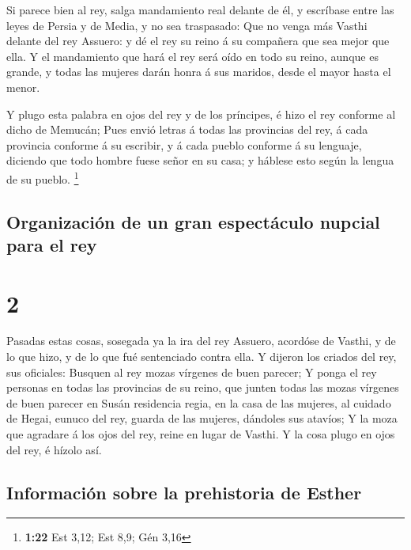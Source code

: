  Si parece bien al rey, salga mandamiento real delante de
él, y escríbase entre las leyes de Persia y de Media, y no sea
traspasado: Que no venga más Vasthi delante del rey Assuero: y dé el rey
su reino á su compañera que sea mejor que ella.  Y el
mandamiento que hará el rey será oído en todo su reino, aunque es
grande, y todas las mujeres darán honra á sus maridos, desde el mayor
hasta el menor.

 Y plugo esta palabra en ojos del rey y de los príncipes,
é hizo el rey conforme al dicho de Memucán;  Pues envió
letras á todas las provincias del rey, á cada provincia conforme á su
escribir, y á cada pueblo conforme á su lenguaje, diciendo que todo
hombre fuese señor en su casa; y háblese esto según la lengua de su
pueblo. \footnote{\textbf{1:22} Est 3,12; Est 8,9; Gén 3,16}

\hypertarget{organizaciuxf3n-de-un-gran-espectuxe1culo-nupcial-para-el-rey}{%
\subsection{Organización de un gran espectáculo nupcial para el
rey}\label{organizaciuxf3n-de-un-gran-espectuxe1culo-nupcial-para-el-rey}}

\hypertarget{section-1}{%
\section{2}\label{section-1}}

 Pasadas estas cosas, sosegada ya la ira del rey Assuero,
acordóse de Vasthi, y de lo que hizo, y de lo que fué sentenciado contra
ella.  Y dijeron los criados del rey, sus oficiales:
Busquen al rey mozas vírgenes de buen parecer;  Y ponga el
rey personas en todas las provincias de su reino, que junten todas las
mozas vírgenes de buen parecer en Susán residencia regia, en la casa de
las mujeres, al cuidado de Hegai, eunuco del rey, guarda de las mujeres,
dándoles sus atavíos;  Y la moza que agradare á los ojos
del rey, reine en lugar de Vasthi. Y la cosa plugo en ojos del rey, é
hízolo así.

\hypertarget{informaciuxf3n-sobre-la-prehistoria-de-esther}{%
\subsection{Información sobre la prehistoria de
Esther}\label{informaciuxf3n-sobre-la-prehistoria-de-esther}}

